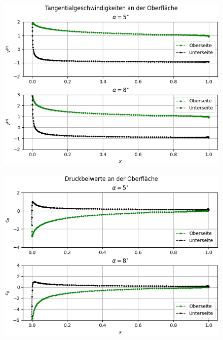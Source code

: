 \begin{figure}[H]
\begin{center} \includegraphics[scale=0.77]{figures/zone40vtlines.png} \end{center}
\end{figure}
\begin{figure}[H]
\begin{center} \includegraphics[scale=0.77]{figures/zone40cplines.png} \end{center}
\end{figure}



\newpage
